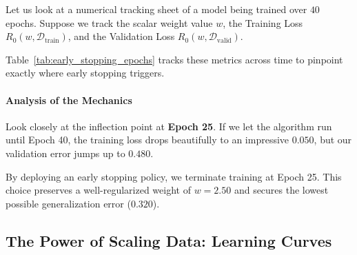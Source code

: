 \documentclass{article}
\begin{document}
Let us look at a numerical tracking sheet of a model being trained over $40$ epochs. Suppose we track the scalar weight value $w$, the Training Loss $R_0(w, \mathcal{D}_{\text{train}})$, and the Validation Loss $R_0(w, \mathcal{D}_{\text{valid}})$. 

Table~\ref{tab:early_stopping_epochs} tracks these metrics across time to pinpoint exactly where early stopping triggers.

\begin{table}[htbp]
\centering
\small
\renewcommand{\arraystretch}{1.3}
\caption{Epoch Tracking Data Exhibiting Validation Divergence}
\label{tab:early_stopping_epochs}
\end{table}

\paragraph{Analysis of the Mechanics}
Look closely at the inflection point at \textbf{Epoch 25}. If we let the algorithm run until Epoch 40, the training loss drops beautifully to an impressive $0.050$, but our validation error jumps up to $0.480$. 

By deploying an early stopping policy, we terminate training at Epoch 25. This choice preserves a well-regularized weight of $w = 2.50$ and secures the lowest possible generalization error ($0.320$).

\subsection{The Power of Scaling Data: Learning Curves}
\end{document}
